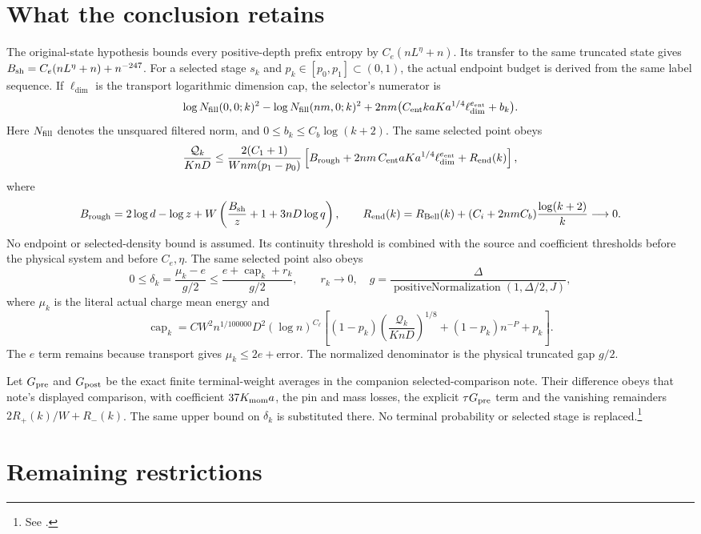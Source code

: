 \documentclass{article}
\begin{document}
\section{What the conclusion retains}

The original-state hypothesis bounds every positive-depth prefix entropy
by $C_e(nL^\eta+n)$. Its transfer to the same truncated state gives
$B_{\rm sh}=C_e(nL^\eta+n)+n^{-247}$. For a selected stage $s_k$ and
$p_k\in[p_0,p_1]\subset(0,1)$, the actual endpoint budget is derived from
the same label sequence. If $\ell_{\dim}$ is the transport logarithmic
dimension cap, the selector's numerator is
\[
 \log N_{\rm fill}(0,0;k)^2-\log N_{\rm fill}(nm,0;k)^2
 +2nm\bigl(C_{\rm ent}kaK a^{1/4}\ell_{\dim}^{e_{\rm ent}}+b_k\bigr).
\]
Here $N_{\rm fill}$ denotes the unsquared filtered norm, and
$0\le b_k\le C_b\log(k+2)$. The same selected point obeys
\[
 \frac{\mathcal Q_k}{KnD}\le
 \frac{2(C_1+1)}{Wnm(p_1-p_0)}
 \left[B_{\rm rough}+2nm\,C_{\rm ent}aK a^{1/4}
   \ell_{\dim}^{e_{\rm ent}}+R_{\rm end}(k)\right],
\]
where
\[
 B_{\rm rough}=2\log d-\log z+
 W\left(\frac{B_{\rm sh}}z+1+3nD\log q\right),\qquad
 R_{\rm end}(k)=R_{\rm Bell}(k)
   +(C_i+2nmC_b)\frac{\log(k+2)}k\longrightarrow0.
\]
No endpoint or selected-density bound is assumed. Its continuity threshold
is combined with the source and coefficient thresholds before the physical
system and before $C_e,\eta$. The same selected point also obeys
\[
 0\le\delta_k=\frac{\mu_k-e}{g/2}
 \le\frac{e+\operatorname{cap}_k+r_k}{g/2},\qquad r_k\longrightarrow0,
 \quad g=\frac{\Delta}{\operatorname{positiveNormalization}(1,\Delta/2,J)},
\]
where $\mu_k$ is the literal actual charge mean energy and
\[
 \operatorname{cap}_k=CW^2n^{1/100000}D^2(\log n)^{C_\ell}
 \left[(1-p_k)\left(\frac{\mathcal Q_k}{KnD}\right)^{1/8}
 +(1-p_k)n^{-P}+p_k\right].
\]
The $e$ term remains because transport gives $\mu_k\le2e+$error.
The normalized denominator is the physical truncated gap $g/2$.

Let $G_{\rm pre}$ and $G_{\rm post}$ be the exact finite terminal-weight
averages in the companion selected-comparison note. Their difference
obeys that note's displayed comparison, with coefficient $37K_{\rm mom}a$,
the pin and mass losses, the explicit $\tau G_{\rm pre}$ term and the
vanishing remainders $2R_+(k)/W+R_-(k)$. The same upper bound on
$\delta_k$ is substituted there. No terminal probability or selected
stage is replaced.\footnote{See
  .}

\section{Remaining restrictions}
\end{document}
